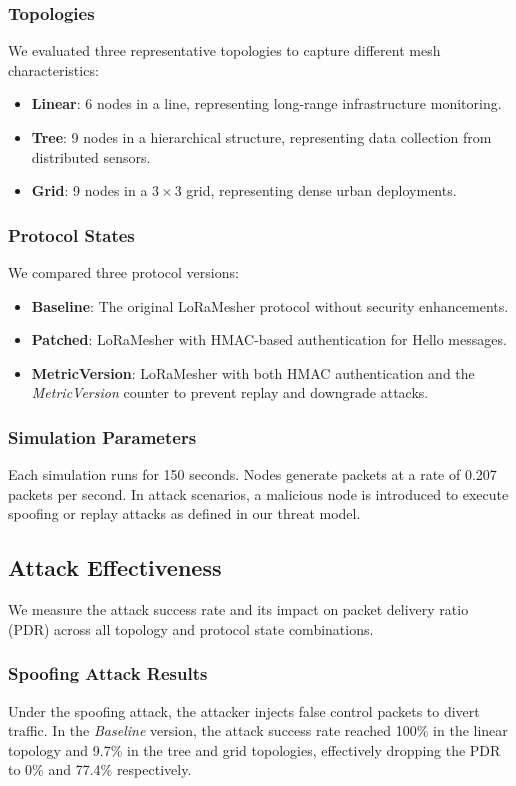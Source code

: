 \documentclass[10pt,journal]{IEEEtran}
\begin{document}
\subsubsection{Topologies}
We evaluated three representative topologies to capture different mesh characteristics:
\begin{itemize}
	\item \textbf{Linear}: 6 nodes in a line, representing long-range infrastructure monitoring.
	\item \textbf{Tree}: 9 nodes in a hierarchical structure, representing data collection from distributed sensors.
	\item \textbf{Grid}: 9 nodes in a $3\times3$ grid, representing dense urban deployments.
\end{itemize}

\subsubsection{Protocol States}
We compared three protocol versions:
\begin{itemize}
	\item \textbf{Baseline}: The original LoRaMesher protocol without security enhancements.
	\item \textbf{Patched}: LoRaMesher with HMAC-based authentication for Hello messages.
	\item \textbf{MetricVersion}: LoRaMesher with both HMAC authentication and the \textit{MetricVersion} counter to prevent replay and downgrade attacks.
\end{itemize}

\subsubsection{Simulation Parameters}
Each simulation runs for 150 seconds. Nodes generate packets at a rate of 0.207 packets per second. In attack scenarios, a malicious node is introduced to execute spoofing or replay attacks as defined in our threat model.

\subsection{Attack Effectiveness}

We measure the attack success rate and its impact on packet delivery ratio (PDR) across all topology and protocol state combinations.

\subsubsection{Spoofing Attack Results}
Under the spoofing attack, the attacker injects false control packets to divert traffic. In the \textit{Baseline} version, the attack success rate reached 100\% in the linear topology and 9.7\% in the tree and grid topologies, effectively dropping the PDR to 0\% and 77.4\% respectively.
\end{document}
